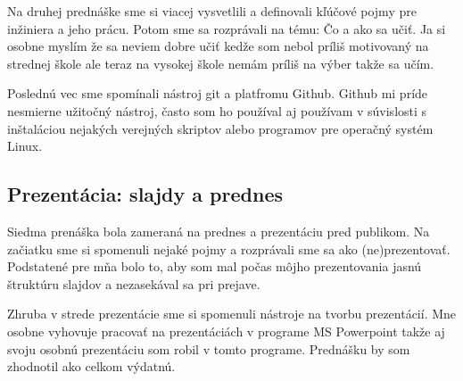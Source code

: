 \documentclass[10pt,oneside,slovak,a4paper]{article}
\begin{document}
Na druhej prednáške sme si viacej vysvetlili a definovali kľúčové pojmy pre inžiniera a jeho prácu. Potom sme sa rozprávali na tému: Čo a ako sa učiť. Ja si osobne myslím že sa neviem dobre učiť kedže som nebol príliš motivovaný na strednej škole ale teraz na vysokej škole nemám príliš na výber takže sa učím.

Poslednú vec sme spomínali nástroj git a platfromu Github. Github mi príde nesmierne užitočný nástroj, často som ho používal aj používam v súvislosti s inštaláciou nejakých verejných skriptov alebo programov pre operačný systém Linux.

\subsection{Prezentácia: slajdy a prednes}

Siedma prenáška bola zameraná na prednes a prezentáciu pred publikom. Na začiatku sme si spomenuli nejaké pojmy a rozprávali sme sa ako (ne)prezentovať. Podstatené pre mňa bolo to, aby som mal počas môjho prezentovania jasnú štruktúru slajdov a nezasekával sa pri prejave.

Zhruba v strede prezentácie sme si spomenuli  nástroje na tvorbu prezentácií. Mne osobne vyhovuje pracovať na prezentáciách v programe MS Powerpoint takže aj svoju osobnú prezentáciu som robil v tomto programe. Prednášku by som zhodnotil ako celkom výdatnú.



\end{document}

